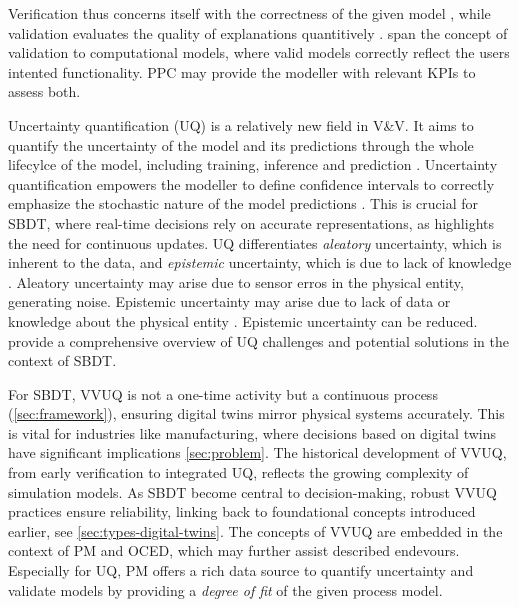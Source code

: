 Verification thus concerns itself with the correctness of the given model \autocite{Sargent2010wsc}, while validation evaluates the quality of explanations quantitively \autocite{Oberkampf2004amr}.  span the concept of validation to computational models, where valid models correctly reflect the users intented functionality. PPC may provide the modeller with relevant KPIs to assess both.

\label{sec:uncertainty-quantification}
Uncertainty quantification (UQ) is a relatively new field in V&V. It aims to quantify the uncertainty of the model and its predictions through the whole lifecylce of the model, including training, inference and prediction \autocite{sel2025survey}. Uncertainty quantification empowers the modeller to define confidence intervals to correctly emphasize the stochastic nature of the model predictions \autocite{volodina2021importance}. This is crucial for SBDT, where real-time decisions rely on accurate representations, as \autocite{francis2021towards} highlights the need for continuous updates. UQ differentiates \textit{aleatory} uncertainty, which is inherent to the data, and \textit{epistemic} uncertainty, which is due to lack of knowledge \autocite{sel2025survey}. Aleatory uncertainty may arise due to sensor erros in the physical entity, generating noise. Epistemic uncertainty may arise due to lack of data or knowledge about the physical entity \autocite{thelen2023comprehensive}. Epistemic uncertainty can be reduced. \Autocite{abdoune2022handling} provide a comprehensive overview of UQ challenges and potential solutions in the context of SBDT.

For SBDT, VVUQ is not a one-time activity but a continuous process (\autoref{sec:framework}), ensuring digital twins mirror physical systems accurately. This is vital for industries like manufacturing, where decisions based on digital twins have significant implications \autoref{sec:problem}.
The historical development of VVUQ, from early verification to integrated UQ, reflects the growing complexity of simulation models. As SBDT become central to decision-making, robust VVUQ practices ensure reliability, linking back to foundational concepts introduced earlier, see \autoref{sec:types-digital-twins}. The concepts of VVUQ are embedded in the context of PM and OCED, which may further assist described endevours. Especially for UQ, PM offers a rich data source to quantify uncertainty and validate models by providing a \textit{degree of fit} of the given process model.


